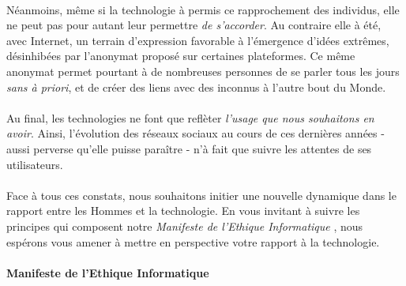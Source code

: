 \paragraph{} Néanmoins, même si la technologie à permis ce rapprochement des individus, elle ne peut pas pour
autant leur permettre \emph{de s'accorder}. Au contraire elle à été, avec Internet, un terrain d'expression
favorable à l'émergence d'idées extrêmes, désinhibées par l'anonymat proposé sur certaines plateformes. Ce même
anonymat permet pourtant à de nombreuses personnes de se parler tous les jours \emph{sans à priori}, et de créer
des liens avec des inconnus à l'autre bout du Monde.

\paragraph{} Au final, les technologies ne font que reflèter \emph{l'usage que nous souhaitons en avoir}. 
Ainsi, l'évolution des réseaux sociaux au cours de ces dernières années - aussi perverse qu'elle puisse paraître -
n'à fait que suivre les attentes de ses utilisateurs.

\paragraph{} Face à tous ces constats, nous souhaitons initier une nouvelle dynamique dans le rapport entre les
Hommes et la technologie. En vous invitant à suivre les principes qui composent notre \emph{Manifeste de l'Ethique
Informatique} \cite{FriesMilano0}, nous espérons vous amener à mettre en perspective votre rapport à la technologie.

\paragraph{Manifeste de l'Ethique Informatique}

